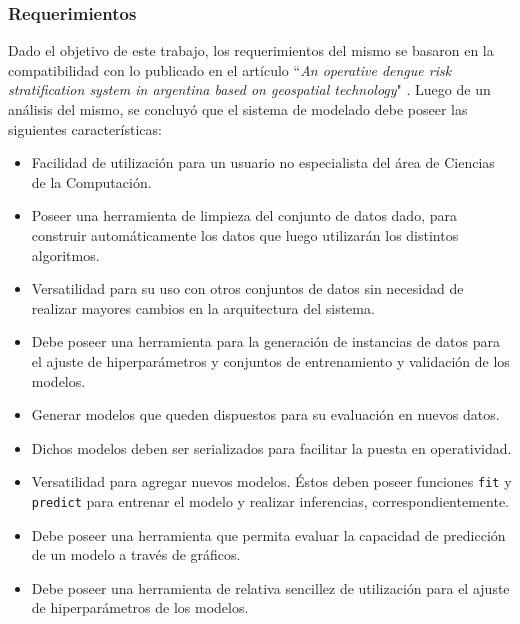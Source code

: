       \subsubsection{Requerimientos}
        \par Dado el objetivo de este trabajo, los requerimientos del mismo se
          basaron en la compatibilidad con lo publicado en el artículo ``\textit{An operative dengue risk stratification system in
argentina based on geospatial technology}" \cite{porcasi_operative}.
          Luego de un análisis del mismo, se concluyó que el sistema de
          modelado debe poseer las siguientes características:
          \begin{itemize}
            \item Facilidad de utilización para un usuario no especialista del área de
              Ciencias de la Computación.

            \item Poseer una herramienta de limpieza del conjunto de datos
              dado, para construir automáticamente los datos que luego
              utilizarán los distintos algoritmos.

            \item Versatilidad para su uso con otros conjuntos de datos sin necesidad
              de realizar mayores cambios en la arquitectura del sistema.

            \item Debe poseer una herramienta para la generación de instancias
              de datos para el ajuste de hiperparámetros y
              conjuntos de entrenamiento y validación de los modelos.

            \item Generar modelos que queden dispuestos para su evaluación en
              nuevos datos.

            \item Dichos modelos deben ser serializados para facilitar la puesta
            en operatividad.

            \item Versatilidad para agregar nuevos modelos. Éstos deben
              poseer funciones \verb|fit| y \verb|predict| para entrenar el
              modelo y realizar inferencias, correspondientemente.

            \item Debe poseer una herramienta que permita evaluar la
              capacidad de predicción de un modelo a través de gráficos.

            \item Debe poseer una herramienta de relativa sencillez de utilización
              para el ajuste de hiperparámetros de los modelos.
          \end{itemize}


